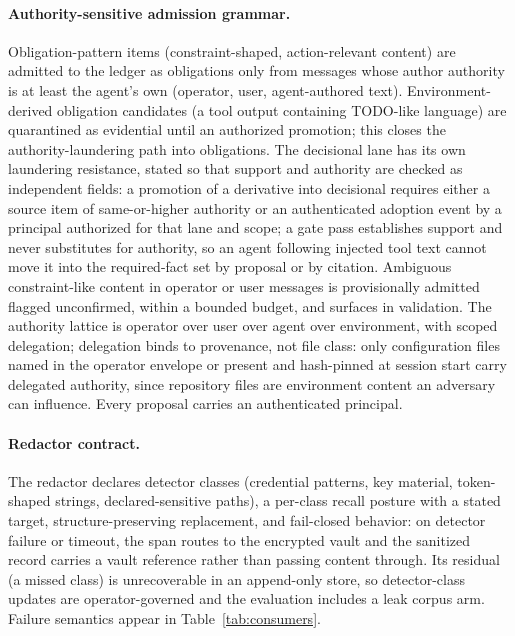 \documentclass[11pt]{article}
\begin{document}
\paragraph{Authority-sensitive admission grammar.} Obligation-pattern items (constraint-shaped, action-relevant content) are admitted to the ledger as obligations only from messages whose author authority is at least the agent's own (operator, user, agent-authored text). Environment-derived obligation candidates (a tool output containing TODO-like language) are quarantined as evidential until an authorized promotion; this closes the authority-laundering path into obligations. The decisional lane has its own laundering resistance, stated so that support and authority are checked as independent fields: a promotion of a derivative into decisional requires either a source item of same-or-higher authority or an authenticated adoption event by a principal authorized for that lane and scope; a gate pass establishes support and never substitutes for authority, so an agent following injected tool text cannot move it into the required-fact set by proposal or by citation. Ambiguous constraint-like content in operator or user messages is provisionally admitted flagged unconfirmed, within a bounded budget, and surfaces in validation. The authority lattice is operator over user over agent over environment, with scoped delegation; delegation binds to provenance, not file class: only configuration files named in the operator envelope or present and hash-pinned at session start carry delegated authority, since repository files are environment content an adversary can influence. Every proposal carries an authenticated principal.

\paragraph{Redactor contract.} The redactor declares detector classes (credential patterns, key material, token-shaped strings, declared-sensitive paths), a per-class recall posture with a stated target, structure-preserving replacement, and fail-closed behavior: on detector failure or timeout, the span routes to the encrypted vault and the sanitized record carries a vault reference rather than passing content through. Its residual (a missed class) is unrecoverable in an append-only store, so detector-class updates are operator-governed and the evaluation includes a leak corpus arm. Failure semantics appear in Table~\ref{tab:consumers}.
\end{document}

